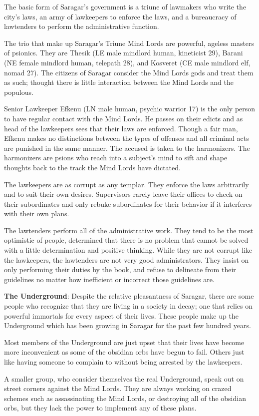 {
	The basic form of Saragar's government is a triune of 	lawmakers who write the city's laws, an army of lawkeepers to enforce the laws, and a bureaucracy of lawtenders to perform the administrative function.

	The trio that make up Saragar's Triune Mind Lords are powerful, ageless masters of psionics. They are Thesik (LE male mindlord human, kineticist 29), Barani (NE female mindlord human, telepath 28), and Kosveret (CE male mindlord elf, nomad 27). The citizens of Saragar consider the Mind Lords gods and treat them as such; thought there is little interaction between the Mind Lords and the populous.

	Senior Lawkeeper Efkenu (LN male human, psychic warrior 17) is the only person to have regular contact with the Mind Lords. He passes on their edicts and as head of the lawkeepers sees that their laws are enforced. Though a fair man, Efkenu makes no distinctions between the types of offenses and all criminal acts are punished in the same manner. The accused is taken to the harmonizers. The harmonizers are psions who reach into a subject's mind to sift and shape thoughts back to the track the Mind Lords have dictated.

	The lawkeepers are as corrupt as any templar. They enforce the laws arbitrarily and to suit their own desires. Supervisors rarely leave their offices to check on their subordinates and only rebuke subordinates for their behavior if it interferes with their own plans.

	The lawtenders perform all of the administrative work. They tend to be the most optimistic of people, determined that there is no problem that cannot be solved with a little determination and positive thinking. While they are not corrupt like the lawkeepers, the lawtenders are not very good administrators. They insist on only performing their duties by the book, and refuse to delineate from their guidelines no matter how inefficient or incorrect those guidelines are.
}
{
	\textbf{The Underground}: Despite the relative pleasantness of Saragar, there are some people who recognize that they are living in a society in decay; one that relies on powerful immortals for every aspect of their lives. These people make up the Underground which has been growing in Saragar for the past few hundred years.

	Most members of the Underground are just upset that their lives have become more inconvenient as some of the obsidian orbs have begun to fail. Others just like having someone to complain to without being arrested by the lawkeepers.

	A smaller group, who consider themselves the real Underground, speak out on street corners against the Mind Lords. They are always working on crazed schemes such as assassinating the Mind Lords, or destroying all of the obsidian orbs, but they lack the power to implement any of these plans.
}
